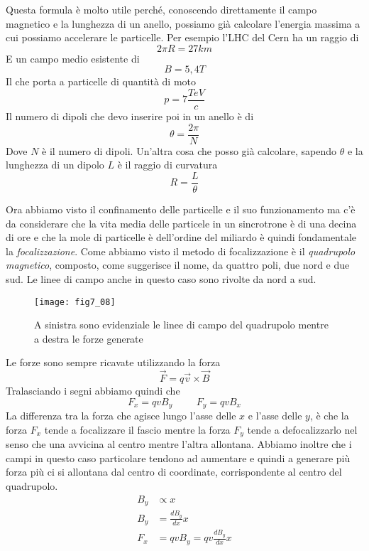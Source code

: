 Questa formula è molto utile perché, conoscendo direttamente il campo magnetico e la lunghezza di un anello, possiamo già calcolare l'energia massima a cui possiamo accelerare le particelle.
Per esempio l'LHC del Cern ha un raggio di 
\begin{equation}
2\pi R=27km
\end{equation}
E un campo medio esistente di 
\begin{equation}
B=5,4T
\end{equation}
Il che porta a particelle di quantità di moto
\begin{equation}
p=7\frac{TeV}{c}
\end{equation}
Il numero di dipoli che devo inserire poi in un anello è di 
\begin{equation}
\theta=\frac{2\pi}{N}
\end{equation}
Dove $N$ è il numero di dipoli.
Un'altra cosa che posso già calcolare, sapendo $\theta$ e la lunghezza di un dipolo $L$ è il raggio di curvatura
\begin{equation}
R=\frac{L}{\theta}
\end{equation}

Ora abbiamo visto il confinamento delle particelle e il suo funzionamento ma c'è da considerare che la vita media delle particele in un sincrotrone è di una decina di ore e che la mole di particelle è dell'ordine del miliardo è quindi fondamentale la \emph{focalizzazione}.
Come abbiamo visto il metodo di focalizzazione è il \emph{quadrupolo magnetico}, composto, come suggerisce il nome, da quattro poli, due nord e due sud.
Le linee di campo anche in questo caso sono rivolte da nord a sud.
\begin{figure}[h]
\centering
\texttt{[image: fig7\_08]}
\caption{A sinistra sono evidenziale le linee di campo del quadrupolo mentre a destra le forze generate}
\end{figure}

Le forze sono sempre ricavate utilizzando la forza
\begin{equation}
\vec{F}=q\vec{v}\times\vec{B}
\end{equation}
Tralasciando i segni abbiamo quindi che 
\begin{equation}
F_x=qvB_y\hspace{1cm} F_y=qvB_x
\end{equation}
La differenza tra la forza che agisce lungo l'asse delle $x$ e l'asse delle $y$, è che la forza $F_x$ tende a focalizzare il fascio mentre la forza $F_y$ tende a defocalizzarlo nel senso che una avvicina al centro mentre l'altra allontana.
Abbiamo inoltre che i campi in questo caso particolare tendono ad aumentare e quindi a generare più forza più ci si allontana dal centro di coordinate, corrispondente al centro del quadrupolo.
\begin{equation}
\begin{split}
B_y & \propto x\\
B_y & =\frac{dB_y}{dx}x\\
F_x & =qvB_y=qv\frac{dB_y}{dx}x
\end{split}
\end{equation}

